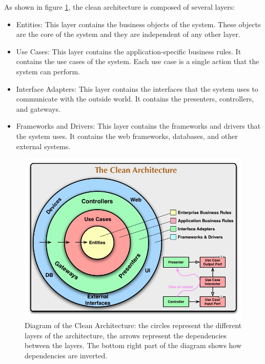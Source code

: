 \begin{spacing}{1.2}
    As shown in figure \ref{fig:clean}, the clean architecture is composed of several layers:
    \begin{itemize}
        \item Entities: This layer contains the business objects of the system. These objects are the core of the system and they are independent of any other layer.
        \item Use Cases: This layer contains the application-specific business rules. It contains the use cases of the system. Each use case is a single action that the system can perform.
        \item Interface Adapters: This layer contains the interfaces that the system uses to communicate with the outside world. It contains the presenters, controllers, and gateways.
        \item Frameworks and Drivers: This layer contains the frameworks and drivers that the system uses. It contains the web frameworks, databases, and other external systems.

    \end{itemize}

    \begin{figure}
        \centering
        \includegraphics[scale=0.5]{Chapitre2/figures/CleanArchitecture.jpg}
        \caption{Diagram of the Clean Architecture: the circles represent the different
            layers of the architecture, the arrows represent the dependencies between the layers.
            The bottom right part of the diagram shows how dependencies are inverted.}
        \label{fig:clean}
    \end{figure}


\end{spacing}
